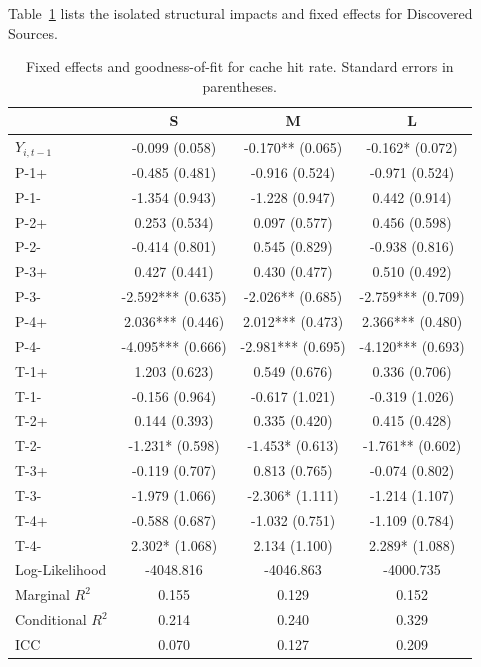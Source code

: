 \FloatBarrier

Table~\ref{tab:full_discovered_sources} lists the isolated structural impacts and fixed effects for Discovered Sources.

\begin{table}[H]
\caption{Fixed effects and goodness-of-fit for cache hit rate. Standard errors in parentheses.}
\label{tab:full_discovered_sources}
\begin{tabular}{lccc}
\toprule
 & S & M & L \\
\midrule
$Y_{i,t-1}$ & -0.099 (0.058) & -0.170** (0.065) & -0.162* (0.072) \\
P-1+ & -0.485 (0.481) & -0.916 (0.524) & -0.971 (0.524) \\
P-1- & -1.354 (0.943) & -1.228 (0.947) & 0.442 (0.914) \\
P-2+ & 0.253 (0.534) & 0.097 (0.577) & 0.456 (0.598) \\
P-2- & -0.414 (0.801) & 0.545 (0.829) & -0.938 (0.816) \\
P-3+ & 0.427 (0.441) & 0.430 (0.477) & 0.510 (0.492) \\
P-3- & -2.592*** (0.635) & -2.026** (0.685) & -2.759*** (0.709) \\
P-4+ & 2.036*** (0.446) & 2.012*** (0.473) & 2.366*** (0.480) \\
P-4- & -4.095*** (0.666) & -2.981*** (0.695) & -4.120*** (0.693) \\
T-1+ & 1.203 (0.623) & 0.549 (0.676) & 0.336 (0.706) \\
T-1- & -0.156 (0.964) & -0.617 (1.021) & -0.319 (1.026) \\
T-2+ & 0.144 (0.393) & 0.335 (0.420) & 0.415 (0.428) \\
T-2- & -1.231* (0.598) & -1.453* (0.613) & -1.761** (0.602) \\
T-3+ & -0.119 (0.707) & 0.813 (0.765) & -0.074 (0.802) \\
T-3- & -1.979 (1.066) & -2.306* (1.111) & -1.214 (1.107) \\
T-4+ & -0.588 (0.687) & -1.032 (0.751) & -1.109 (0.784) \\
T-4- & 2.302* (1.068) & 2.134 (1.100) & 2.289* (1.088) \\
\midrule
Log-Likelihood & -4048.816 & -4046.863 & -4000.735 \\
Marginal $R^2$ & 0.155 & 0.129 & 0.152 \\
Conditional $R^2$ & 0.214 & 0.240 & 0.329 \\
ICC & 0.070 & 0.127 & 0.209 \\
\bottomrule
\end{tabular}
\end{table}


